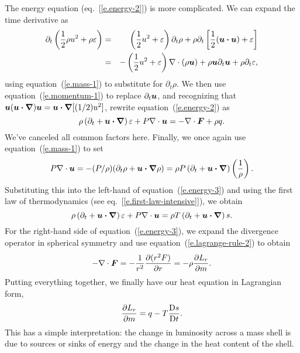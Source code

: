 The energy equation (eq.~[\ref{e.energy-2}]) is more complicated. We can expand the time derivative as
\begin{eqnarray*}
	\partial_{t} \left( \frac{1}{2}\rho u^{2} + \rho \varepsilon \right) 
	&=& \left(\frac{1}{2}u^{2} + \varepsilon\right)\partial_{t}\rho + \rho\partial_{t}\left[\frac{1}{2}(\bm{u}\bm{\cdot}\bm{u}) + \varepsilon\right]\\
	&=& -\left(\frac{1}{2}u^{2} + \varepsilon\right)\nabla \cdot\left(\rho\bm{u}\right) + \rho \bm{u}\partial_{t}\bm{u} + \rho\partial_{t}\varepsilon,
\end{eqnarray*}
using equation~(\ref{e.mass-1}) to substitute for $\partial_{t}\rho$.  We then use equation~(\ref{e.momentum-1}) to replace $\partial_{t}\bm{u}$, and recognizing that $\bm{u}(\bm{u}\bm{\cdot}\bm{\nabla})\bm{u} = \bm{u}\bm{\cdot}\bm{\nabla}[(1/2)u^{2}]$, rewrite equation~(\ref{e.energy-2}) as
\begin{equation}\label{e.energy-3}
	\rho\left(\partial_{t} + \bm{u}\bm{\cdot}\bm{\nabla}\right) \varepsilon + P\nabla \cdot\bm{u} = -\nabla \cdot\bm{F} + \rho q.
\end{equation}
We've canceled all common factors here.  Finally, we once again use equation~(\ref{e.mass-1}) to set 
\[
	P\nabla \cdot\bm{u} = -(P/\rho)(\partial_{t}\rho + \bm{u}\bm{\cdot}\bm{\nabla} \rho) 
	= \rho P\left(\partial_{t} + \bm{u}\bm{\cdot}\bm{\nabla}\right)\left(\frac{1}{\rho}\right).
\]
Substituting this into the left-hand of equation~(\ref{e.energy-3})  and using the first law of thermodynamics (see eq.~[\ref{e.first-law-intensive}]), we obtain
\begin{equation}
\rho\left(\partial_{t} + \bm{u}\bm{\cdot}\bm{\nabla}\right) \varepsilon + P\nabla \cdot\bm{u} = \rho T \left(\partial_{t} + \bm{u}\bm{\cdot}\bm{\nabla}\right) s.
\end{equation}
For the right-hand side of equation~(\ref{e.energy-3}), we expand the divergence operator in spherical symmetry and use equation~(\ref{e.lagrange-rule-2}) to obtain
\[
	-\nabla \cdot\bm{F} = -\frac{1}{r^{2}}\frac{\partial(r^{2} F)}{\partial r} = -\rho\frac{\partial L_{r}}{\partial m}.
\]
Putting everything together, we finally have our heat equation in Lagrangian form,
\begin{equation}\label{e.lagrange-heat}
	\frac{\partial L_{r}}{\partial m} = q - T\frac{\mathrm{D} s}{\mathrm{D} t}.
\end{equation}
This has a simple interpretation: the change in luminosity across a mass shell is due to sources or sinks of energy and the change in the heat content of the shell.  


